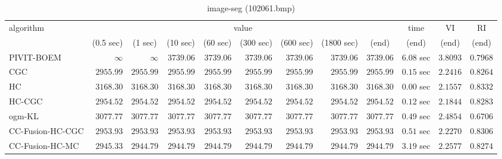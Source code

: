 \begin{table}[H]
\scriptsize
\centering
\caption{image-seg (102061.bmp)}
\label{tab:anytimetable-image-seg-102061.bmp}
\begin{tabular}{lrrrrrrrrrrr}
\toprule
           algorithm &                                   \multicolumn{8}{c}{value} & \multicolumn{1}{c}{time}    & \multicolumn{1}{c}{VI}  & \multicolumn{1}{c}{RI} \\  
\cmidrule(lr){2-9}\cmidrule(lr){10-10} \cmidrule(lr){11-11} \cmidrule(lr){12-12}   
                     & \multicolumn{1}{c}{(0.5 sec)} & \multicolumn{1}{c}{(1 sec)} & \multicolumn{1}{c}{(10 sec)} & \multicolumn{1}{c}{(60 sec)} & \multicolumn{1}{c}{(300 sec)} & \multicolumn{1}{c}{(600 sec)} & \multicolumn{1}{c}{(1800 sec)} & \multicolumn{1}{c}{(end)} & \multicolumn{1}{c}{(end)}    & \multicolumn{1}{c}{(end)}   & \multicolumn{1}{c}{(end)}  \\ \midrule 
          PIVIT-BOEM & $\infty$ & $\infty$ & $      3739.06$ & $      3739.06$ & $      3739.06$ & $      3739.06$ & $      3739.06$ & $      3739.06$ & $         6.08$ sec    & $       3.8093$  & $       0.7968$ \\ 
                 CGC & $      2955.99$ & $      2955.99$ & $      2955.99$ & $      2955.99$ & $      2955.99$ & $      2955.99$ & $      2955.99$ & $      2955.99$ & $         0.15$ sec    & $       2.2416$  & $       0.8264$ \\ 
                  HC & $      3168.30$ & $      3168.30$ & $      3168.30$ & $      3168.30$ & $      3168.30$ & $      3168.30$ & $      3168.30$ & $      3168.30$ & $         0.00$ sec    & $       2.1557$  & $       0.8332$ \\ 
              HC-CGC & $      2954.52$ & $      2954.52$ & $      2954.52$ & $      2954.52$ & $      2954.52$ & $      2954.52$ & $      2954.52$ & $      2954.52$ & $         0.12$ sec    & $       2.1844$  & $       0.8283$ \\ 
              ogm-KL & $      3077.77$ & $      3077.77$ & $      3077.77$ & $      3077.77$ & $      3077.77$ & $      3077.77$ & $      3077.77$ & $      3077.77$ & $         0.49$ sec    & $       2.4854$  & $       0.6706$ \\ 
    CC-Fusion-HC-CGC & $      2953.93$ & $      2953.93$ & $      2953.93$ & $      2953.93$ & $      2953.93$ & $      2953.93$ & $      2953.93$ & $      2953.93$ & $         0.51$ sec    & $       2.2270$  & $       0.8306$ \\ 
     CC-Fusion-HC-MC & $      2945.33$ & $      2944.79$ & $      2944.79$ & $      2944.79$ & $      2944.79$ & $      2944.79$ & $      2944.79$ & $      2944.79$ & $         3.19$ sec    & $       2.2577$  & $       0.8274$ \\ 

\end{tabular}
\end{table}
